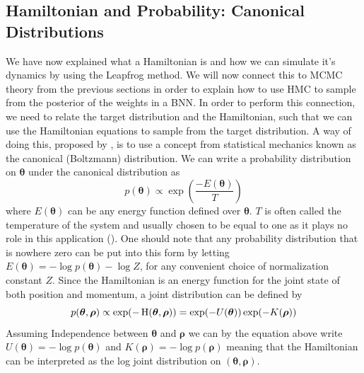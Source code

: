 \subsection{Hamiltonian and Probability: Canonical Distributions}
We have now explained what a Hamiltonian is and how we can simulate it's dynamics by using the Leapfrog method. We will now connect this to MCMC theory from the previous sections in order to explain how to use HMC to sample from the posterior of the weights in a BNN. In order to perform this connection, we need to relate the target distribution and the Hamiltonian, such that we can use the Hamiltonian equations to sample from the target distribution. A way of doing this, proposed by \cite{neal2012bayesian}, is to use a concept from statistical mechanics known as the canonical (Boltzmann) distribution. We can write a probability distribution on $\boldsymbol{\theta}$ under the canonical distribution as
\begin{equation*}
    p(\boldsymbol{\theta})\propto \exp\left(\frac{-E(\boldsymbol{\theta})}{T}\right)
\end{equation*}
where $E(\boldsymbol{\theta})$ can be any energy function defined over $\boldsymbol{\theta}$. $T$ is often called the temperature of the system and usually chosen to be equal to one as it plays no role in this application (\cite{neal2012bayesian}).
One should note that any probability distribution that is nowhere zero can be put into this form by letting $E(\boldsymbol{\theta})=-\log p(\boldsymbol{\theta})-\log Z$, for any convenient choice of normalization constant $Z$. Since the Hamiltonian is an energy function for the joint state of both position and momentum, a joint distribution can be defined by
\begin{equation*}
p(\boldsymbol{\theta},\boldsymbol{\rho})\propto \exp(-\operatorname{H}(\boldsymbol{\theta},\boldsymbol{\rho}))   = \exp(-U(\boldsymbol{\theta}))\exp(-K(\boldsymbol{\rho}))
\end{equation*}
Assuming Independence between $\boldsymbol{\theta}$ and $\boldsymbol{\rho}$ we can by the equation above write $U(\boldsymbol{\theta})=-\log p(\boldsymbol{\theta})$ and $K(\boldsymbol{\rho})=-\log p(\boldsymbol{\rho})$ meaning that the Hamiltonian can be interpreted as the log joint distribution on $(\boldsymbol{\theta},\boldsymbol{\rho})$. 
\\
\\
